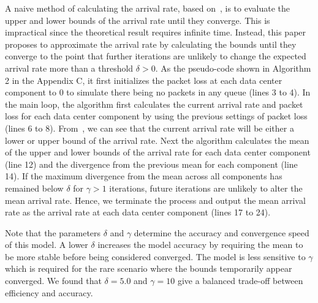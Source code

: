 %

A naive method of calculating the arrival rate, based on~, is to evaluate the upper and lower bounds of the arrival rate until they converge. This is impractical since the theoretical result requires infinite time. Instead, this paper proposes to approximate the arrival rate by calculating the bounds until they converge to the point that further iterations are unlikely to change the expected arrival rate more than a threshold $\delta>0$. As the pseudo-code shown in Algorithm 2 in the Appendix C, it first initializes the packet loss at each data center component to 0 to simulate there being no packets in any queue (lines 3 to 4). In the main loop, the algorithm first calculates the current arrival rate and packet loss for each data center component by using the previous settings of packet loss (lines 6 to 8). From~, we can see that the current arrival rate will be either a lower or upper bound of the arrival rate. Next the algorithm calculates the mean of the upper and lower bounds of the arrival rate for each data center component (line 12) and the divergence from the previous mean for each component (line 14). If the maximum divergence from the mean across all components has remained below $\delta$ for $\gamma>1$ iterations, future iterations are unlikely to alter the mean arrival rate. Hence, we terminate the process and output the mean arrival rate as the arrival rate at each data center component (lines 17 to 24).

Note that the parameters $\delta$ and $\gamma$ determine the accuracy and convergence speed of this model. A lower $\delta$ increases the model accuracy by requiring the mean to be more stable before being considered converged. The model is less sensitive to $\gamma$ which is required for the rare scenario where the bounds temporarily appear converged. We found that $\delta = 5.0$ and $\gamma = 10$ give a balanced trade-off between efficiency and accuracy. 

